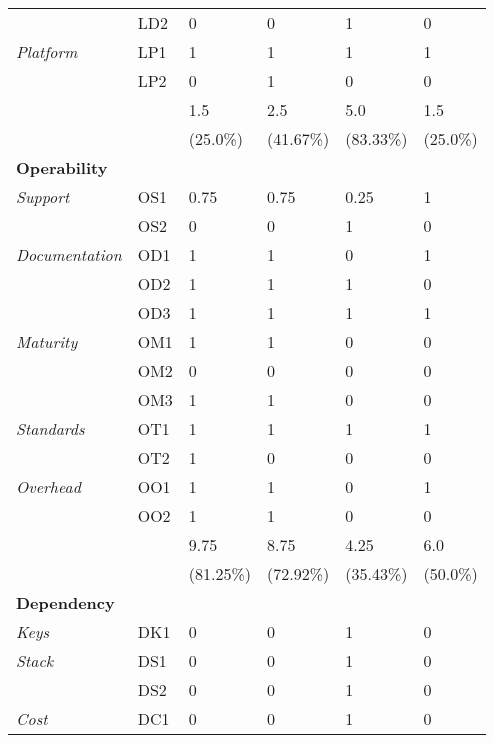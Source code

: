 \begin{longtable}{@{\extracolsep{\fill}}llllll@{}}
                               & LD2 & 0 & 0 & 1 & 0 \\
        \textit{Platform}      & LP1 & 1 & 1 & 1 & 1 \\
                               & LP2 & 0 & 1 & 0 & 0 \\
                               \hline
                               && 1.5 & 2.5 & 5.0 & 1.5 \\
                               && (25.0\%) & (41.67\%) & (83.33\%) & (25.0\%) \\
                               \midrule
        \textbf{Operability} &&&&&\\
        \textit{Support}       & OS1 & 0.75 & 0.75 & 0.25 & 1 \\
                               & OS2 & 0 & 0 & 1 & 0 \\
        \textit{Documentation} & OD1 & 1 & 1 & 0 & 1 \\
                               & OD2 & 1 & 1 & 1 & 0 \\
                               & OD3 & 1 & 1 & 1 & 1 \\
        \textit{Maturity}      & OM1 & 1 & 1 & 0 & 0 \\
                               & OM2 & 0 & 0 & 0 & 0 \\
                               & OM3 & 1 & 1 & 0 & 0 \\
        \textit{Standards}     & OT1 & 1 & 1 & 1 & 1 \\
                               & OT2 & 1 & 0 & 0 & 0 \\
        \textit{Overhead}      & OO1 & 1 & 1 & 0 & 1 \\
                               & OO2 & 1 & 1 & 0 & 0 \\
                               \hline
                               && 9.75 & 8.75 & 4.25 & 6.0 \\
                               && (81.25\%) & (72.92\%) & (35.43\%) & (50.0\%) \\
                               \midrule
        \textbf{Dependency} &&&&&\\
        \textit{Keys}          & DK1 & 0 & 0 & 1 & 0 \\
        \textit{Stack}         & DS1 & 0 & 0 & 1 & 0 \\
                               & DS2 & 0 & 0 & 1 & 0 \\                       
        \textit{Cost}          & DC1 & 0 & 0 & 1 & 0 \\

\end{longtable}

